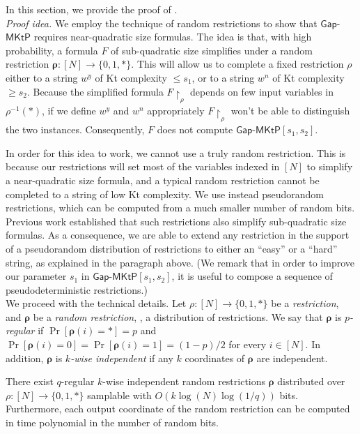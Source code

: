 \documentclass{toc}
\newcommand{\gapmktp}{\mathsf{Gap}$-$\mathsf{MKtP}}
\begin{document}
In this section, we provide the proof of .\\ 

\noindent \emph{Proof idea.} We employ the technique of random restrictions to show that $\gapmktp$ requires near-quadratic size formulas. The idea is that, with high probability, a formula $F$ of sub-quadratic size simplifies under a random restriction $\bm{\rho} \colon [N] \to \{0,1,*\}$. This will allow us to complete a fixed restriction $\rho$ either to a string $w^y$ of Kt complexity $\leq s_1$, or to a string $w^n$ of Kt complexity $\geq s_2$. Because the simplified formula $F\!\upharpoonright_\rho$ depends on few input variables in $\rho^{-1}(*)$, if we define $w^y$ and $w^n$ appropriately $F\!\upharpoonright_\rho$ won't be able to distinguish the two instances. Consequently, $F$ does not compute $\gapmktp[s_1, s_2]$.

In order for this idea to work, we cannot use a truly random restriction. This is because our restrictions will set most of the variables indexed in $[N]$ to simplify a near-quadratic size formula, and a typical random restriction cannot be completed to a string of low Kt complexity. We use instead pseudorandom restrictions, which can be computed from a much  smaller number of random bits. Previous work established that such restrictions also simplify sub-quadratic size formulas. As a consequence, we are able to extend any restriction in the support of a pseudorandom distribution of restrictions to either an ``easy'' or a ``hard'' string, as explained in the paragraph above. (We remark that in order to improve our parameter $s_1$ in $\gapmktp[s_1,s_2]$, it is useful to compose a sequence of pseudodeterministic restrictions.)\\



We proceed with the technical details. Let $\rho \colon [N] \to \{0,1,*\}$ be a \emph{restriction}, and $\bm{\rho}$ be a \emph{random restriction}, \ie, a distribution of restrictions. We say that $\bm{\rho}$ is $p$\emph{-regular} if $\Pr[\bm{\rho}(i) = *] = p$ and $\Pr[\bm{\rho}(i) = 0] = \Pr[\bm{\rho}(i) = 1] = (1-p)/2$ for every $i \in [N]$. In addition, $\bm{\rho}$ is $k$\emph{-wise independent} if any $k$ coordinates of $\bm{\rho}$ are independent. 

\begin{lemma} \label{l:complexity_restriction}
There exist  $q$-regular $k$-wise independent random restrictions $\bm{\rho}$ distributed over $\rho \colon [N] \to \{0,1,*\}$ samplable with $O(k \log (N) \log (1/q))$ bits. Furthermore, each output coordinate of the random restriction can be computed in time polynomial in the number of random bits. 
\end{lemma}
\end{document}
